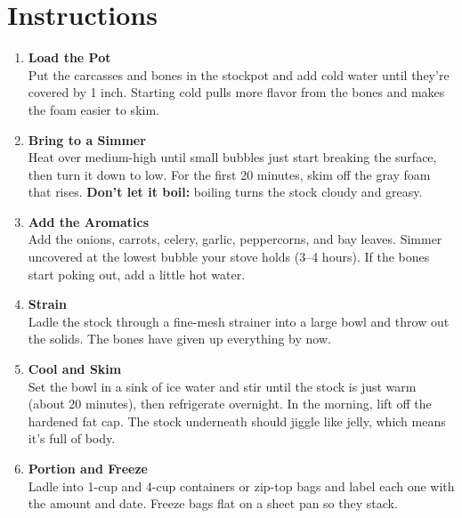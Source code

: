 \newpage
{}
\section*{Instructions}

\begin{enumerate}

      \item \textbf{Load the Pot} \\
            Put the carcasses and bones in the stockpot and add cold water until they're covered by 1 inch. Starting cold pulls more flavor from the bones and makes the foam easier to skim.

      \item \textbf{Bring to a Simmer} \\
            Heat over medium-high until small bubbles just start breaking the surface, then turn it down to low. For the first 20 minutes, skim off the gray foam that rises. \textbf{Don't let it boil:} boiling turns the stock cloudy and greasy.

      \item \textbf{Add the Aromatics} \\
            Add the onions, carrots, celery, garlic, peppercorns, and bay leaves. Simmer uncovered at the lowest bubble your stove holds (3--4 hours). If the bones start poking out, add a little hot water.

      \item \textbf{Strain} \\
            Ladle the stock through a fine-mesh strainer into a large bowl and throw out the solids. The bones have given up everything by now.

      \item \textbf{Cool and Skim} \\
            Set the bowl in a sink of ice water and stir until the stock is just warm (about 20 minutes), then refrigerate overnight. In the morning, lift off the hardened fat cap. The stock underneath should jiggle like jelly, which means it's full of body.

      \item \textbf{Portion and Freeze} \\
            Ladle into 1-cup and 4-cup containers or zip-top bags and label each one with the amount and date. Freeze bags flat on a sheet pan so they stack.

\end{enumerate}


